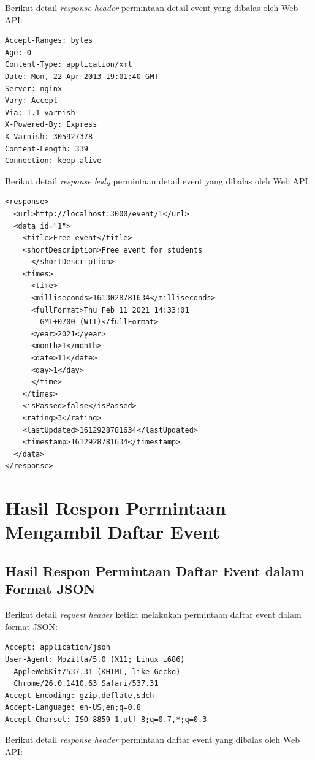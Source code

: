 \documentclass[a4paper, 12pt, oneside]{report}
\begin{document}
Berikut detail \textit{response header} permintaan detail event yang dibalas oleh Web API:

\begin{lstlisting}[frame=single]
Accept-Ranges: bytes 
Age: 0 
Content-Type: application/xml
Date: Mon, 22 Apr 2013 19:01:40 GMT 
Server: nginx 
Vary: Accept 
Via: 1.1 varnish 
X-Powered-By: Express
X-Varnish: 305927378
Content-Length: 339 
Connection: keep-alive
\end{lstlisting}

Berikut detail \textit{response body} permintaan detail event yang dibalas oleh Web API:

\begin{lstlisting}[frame=single]
<response>
  <url>http://localhost:3000/event/1</url>
  <data id="1">
    <title>Free event</title>
    <shortDescription>Free event for students
      </shortDescription>
    <times>
      <time>
      <milliseconds>1613028781634</milliseconds>
      <fullFormat>Thu Feb 11 2021 14:33:01 
        GMT+0700 (WIT)</fullFormat>
      <year>2021</year>
      <month>1</month>
      <date>11</date>
      <day>1</day>
      </time>
    </times>
    <isPassed>false</isPassed>
    <rating>3</rating>
    <lastUpdated>1612928781634</lastUpdated>
    <timestamp>1612928781634</timestamp>
  </data>
</response>
\end{lstlisting}

\section{Hasil Respon Permintaan Mengambil Daftar Event}

\subsection{Hasil Respon Permintaan Daftar Event dalam Format JSON}

Berikut detail \textit{request header} ketika melakukan permintaan daftar event dalam format JSON:

\begin{lstlisting}[frame=single]
Accept: application/json
User-Agent: Mozilla/5.0 (X11; Linux i686)
  AppleWebKit/537.31 (KHTML, like Gecko)
  Chrome/26.0.1410.63 Safari/537.31
Accept-Encoding: gzip,deflate,sdch
Accept-Language: en-US,en;q=0.8
Accept-Charset: ISO-8859-1,utf-8;q=0.7,*;q=0.3
\end{lstlisting}

Berikut detail \textit{response header} permintaan daftar event yang dibalas oleh Web API:
\end{document}
